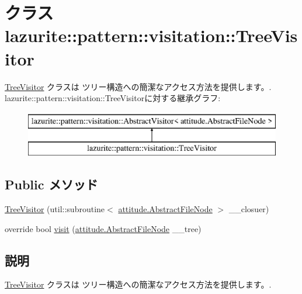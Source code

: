 \hypertarget{classlazurite_1_1pattern_1_1visitation_1_1_tree_visitor}{
\section{クラス lazurite::pattern::visitation::TreeVisitor}
\label{classlazurite_1_1pattern_1_1visitation_1_1_tree_visitor}
}


\hyperlink{classlazurite_1_1pattern_1_1visitation_1_1_tree_visitor}{TreeVisitor} クラスは ツリー構造への簡潔なアクセス方法を提供します。.  
lazurite::pattern::visitation::TreeVisitorに対する継承グラフ:\begin{figure}[H]
\begin{center}
\leavevmode
\includegraphics[height=2cm]{classlazurite_1_1pattern_1_1visitation_1_1_tree_visitor}
\end{center}
\end{figure}
\subsection*{Public メソッド}
\begin{DoxyCompactItemize}
\item 
\hyperlink{classlazurite_1_1pattern_1_1visitation_1_1_tree_visitor_af4221b6b7a2b34783cfe8a8b2d24cd1e}{TreeVisitor} (util::subroutine$<$ \hyperlink{classlazurite_1_1attitude_1_1_abstract_file_node}{attitude.AbstractFileNode} $>$ \_\-\_\-closuer)
\item 
override bool \hyperlink{classlazurite_1_1pattern_1_1visitation_1_1_tree_visitor_abbb8b6183f27e54acb7eef607361c567}{visit} (\hyperlink{classlazurite_1_1attitude_1_1_abstract_file_node}{attitude.AbstractFileNode} \_\-\_\-tree)
\end{DoxyCompactItemize}


\subsection{説明}
\hyperlink{classlazurite_1_1pattern_1_1visitation_1_1_tree_visitor}{TreeVisitor} クラスは ツリー構造への簡潔なアクセス方法を提供します。. 

